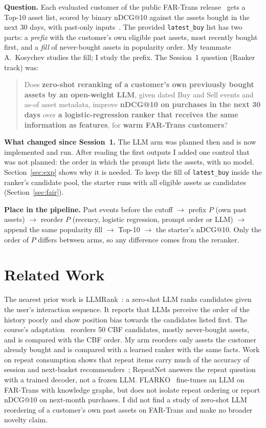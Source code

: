 \documentclass[conference]{IEEEtran}
\begin{document}
\textbf{Question.} Each evaluated customer of the public FAR-Trans release~\cite{farTrans,farTransData} gets a Top-10 asset list, scored by binary nDCG@10 against the assets bought in the next 30 days, with past-only inputs~\cite{starter}. The provided \texttt{latest\_buy} list has two parts: a \emph{prefix} with the customer's own eligible past assets, most recently bought first, and a \emph{fill} of never-bought assets in popularity order. My teammate A.~Kosychev studies the fill; I study the prefix. The Session~1 question (Ranker track) was:
\begin{quote}
Does \textbf{zero-shot reranking of a customer's own previously bought assets by an open-weight LLM}, given dated Buy and Sell events and as-of asset metadata, improve \textbf{nDCG@10 on purchases in the next 30 days} over \textbf{a logistic-regression ranker that receives the same information as features}, for \textbf{warm FAR-Trans customers}?
\end{quote}

\textbf{What changed since Session~1.} The LLM arm was planned then and is now implemented and run. After reading the first outputs I added one control that was not planned: the order in which the prompt lists the assets, with no model. Section~\ref{sec:exp} shows why it is needed. To keep the fill of \texttt{latest\_buy} inside the ranker's candidate pool, the starter runs with all eligible assets as candidates (Section~\ref{sec:fair}).

\textbf{Place in the pipeline.} Past events before the cutoff $\rightarrow$ prefix $P$ (own past assets) $\rightarrow$ reorder $P$ (recency, logistic regression, prompt order or LLM) $\rightarrow$ append the same popularity fill $\rightarrow$ Top-10 $\rightarrow$ the starter's nDCG@10. Only the order of $P$ differs between arms, so any difference comes from the reranker.

\section{Related Work}

The nearest prior work is LLMRank~\cite{llmrank}: a zero-shot LLM ranks candidates given the user's interaction sequence. It reports that LLMs perceive the order of the history poorly and show position bias towards the candidates listed first. The course's adaptation~\cite{baselines} reorders 50 CBF candidates, mostly never-bought assets, and is compared with the CBF order. My arm reorders only assets the customer already bought and is compared with a learned ranker with the same facts. Work on repeat consumption shows that repeat items carry much of the accuracy of session and next-basket recommenders~\cite{repeatnet,nbrcheck}; RepeatNet answers the repeat question with a trained decoder, not a frozen LLM. FLARKO~\cite{flarko} fine-tunes an LLM on FAR-Trans with knowledge graphs, but does not isolate repeat ordering or report nDCG@10 on next-month purchases. I did not find a study of zero-shot LLM reordering of a customer's own past assets on FAR-Trans and make no broader novelty claim.
\end{document}
